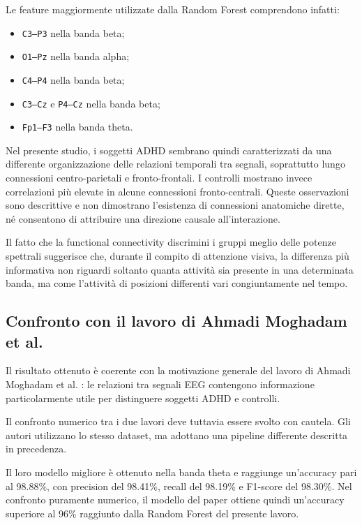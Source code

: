 Le feature maggiormente utilizzate dalla Random Forest comprendono
infatti:

\begin{itemize}
	\item \texttt{C3--P3} nella banda beta;
	\item \texttt{O1--Pz} nella banda alpha;
	\item \texttt{C4--P4} nella banda beta;
	\item \texttt{C3--Cz} e \texttt{P4--Cz} nella banda beta;
	\item \texttt{Fp1--F3} nella banda theta.
\end{itemize}

Nel presente studio, i soggetti ADHD sembrano quindi caratterizzati
da una differente organizzazione delle relazioni temporali tra
segnali, soprattutto lungo connessioni centro-parietali e
fronto-frontali. I controlli mostrano invece correlazioni più elevate
in alcune connessioni fronto-centrali. Queste osservazioni sono
descrittive e non dimostrano l'esistenza di connessioni anatomiche
dirette, né consentono di attribuire una direzione causale
all'interazione.

Il fatto che la functional connectivity discrimini i gruppi meglio
delle potenze spettrali suggerisce che, durante il compito di
attenzione visiva, la differenza più informativa non riguardi
soltanto quanta attività sia presente in una determinata banda, ma
come l'attività di posizioni differenti vari congiuntamente nel
tempo.


\subsection{Confronto con il lavoro di Ahmadi Moghadam et al.}

Il risultato ottenuto è coerente con la motivazione generale del
lavoro di Ahmadi Moghadam et al. \cite{Moghadam2024}: le relazioni
tra segnali EEG contengono informazione particolarmente utile per
distinguere soggetti ADHD e controlli.

Il confronto numerico tra i due lavori deve tuttavia essere svolto
con cautela. Gli autori utilizzano lo stesso dataset, ma adottano una
pipeline differente descritta in precedenza.

Il loro modello migliore è ottenuto nella banda theta e raggiunge un'accuracy pari al 98.88\%, con precision del 98.41\%, recall del 98.19\% e F1-score del 98.30\%.
Nel confronto puramente numerico, il modello del paper ottiene quindi
un'accuracy superiore al 96\% raggiunto dalla Random Forest del
presente lavoro. \cite{Moghadam2024}

